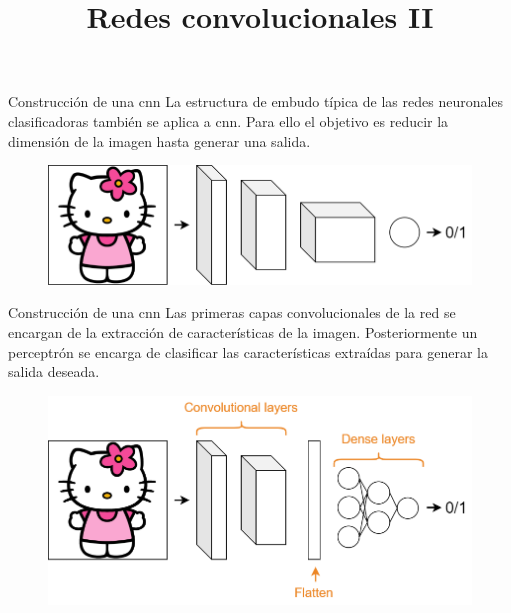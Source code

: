 



\title{Redes convolucionales II}


\maketitle

\begin{frame}{Construcción de una \gls{cnn}}
La estructura de \alert{embudo} típica de las redes neuronales \alert{clasificadoras} también se aplica a \gls{cnn}. Para ello el objetivo es \alert{reducir} la dimensión de la imagen hasta generar una salida.

\begin{figure}
    \centering
    \includegraphics[width=\textwidth]{Slides/figures/Tema 3/CNNEmbudo.png}
\end{figure}
\end{frame}

\begin{frame}{Construcción de una \gls{cnn}}
Las primeras capas \alert{convolucionales} de la red se encargan de la \alert{extracción de características} de la imagen. Posteriormente un \alert{perceptrón} se encarga de \alert{clasificar} las características extraídas para generar la \alert{salida deseada}.

\begin{figure}
    \centering
    \includegraphics[width=\textwidth]{Slides/figures/Tema 3/CNNPerceptron.png}
\end{figure}
\end{frame}

